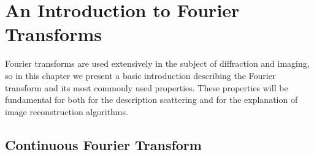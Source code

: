 \chapter{An Introduction to Fourier Transforms}\label{fourier_transform_basics}\noindent
Fourier transforms are used extensively in the subject of diffraction and
imaging, so in this chapter we present a basic introduction describing the
Fourier transform and its most commonly used properties. These properties will
be fundamental for both for the description scattering and for the explanation
of image reconstruction algorithms.

\section{Continuous Fourier Transform}

